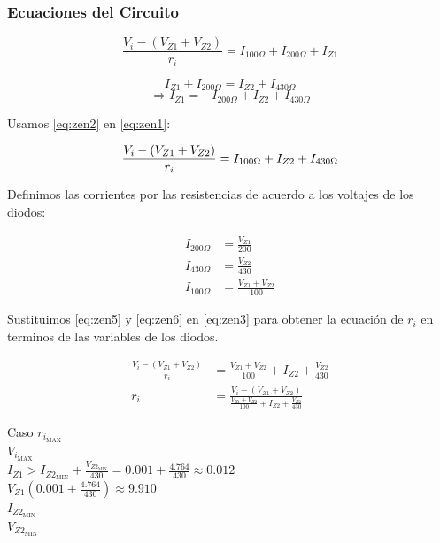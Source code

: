 \documentclass[12pt]{article}
\begin{document}
\subsubsection{Ecuaciones del Circuito}

\begin{equation} \label{eq:zen1}
  \frac{V_i - (V_{Z1}+V_{Z2})}{r_i} = I_{100\Omega} + I_{200\Omega} + I_{Z1}
\end{equation}

\begin{equation*}
  I_{Z1} + I_{200\Omega} = I_{Z2} + I_{430\Omega}
\end{equation*}
\begin{equation} \label{eq:zen2}
  \Rightarrow I_{Z1} = -I_{200\Omega} + I_{Z2} + I_{430\Omega}
\end{equation}

Usamos \ref{eq:zen2} en \ref{eq:zen1}:

\begin{equation} \label{eq:zen3}
  \frac{V_i - (V_{Z1}+V_{Z2})}{r_i} = I_{100\Omega} + I_{Z2} + I_{430\Omega}\\
\end{equation}

Definimos las corrientes por las resistencias de acuerdo a los voltajes de los
diodos:

\begin{align}
  I_{200\Omega} &= \frac{V_{Z1}}{200} \label{eq:zen4} \\
  I_{430\Omega} &= \frac{V_{Z2}}{430} \label{eq:zen5} \\
  I_{100\Omega} &= \frac{V_{Z1} + V_{Z2}}{100} \label{eq:zen6}
\end{align}

Sustituimos \ref{eq:zen5} y \ref{eq:zen6} en \ref{eq:zen3} para obtener la
ecuación de $r_i$ en terminos de las variables de los diodos.

\begin{align}
  \frac{V_i - (V_{Z1}+V_{Z2})}{r_i} &= \frac{V_{Z1} + V_{Z2}}{100} + I_{Z2} + \frac{V_{Z2}}{430} \nonumber \\
  r_i &= \frac{V_i - (V_{Z1}+V_{Z2})}{\frac{V_{Z1} + V_{Z2}}{100} + I_{Z2} + \frac{V_{Z2}}{430}} \label{eq:zen7}
\end{align}

Caso $r_{i_{\mathrm{MAX}}}$\\
$V_{i_{\mathrm{MAX}}}$\\
$I_{Z1} > I_{Z2_{\mathrm{MIN}}} + \frac{V_{Z2_{\mathrm{MIN}}}}{430} = 0.001 + \frac{4.764}{430} \approx 0.012$\\
$V_{Z1}(0.001 + \frac{4.764}{430}) \approx 9.910$\\
$I_{Z2_{\mathrm{MIN}}}$\\
$V_{Z2_{\mathrm{MIN}}}$
\end{document}
